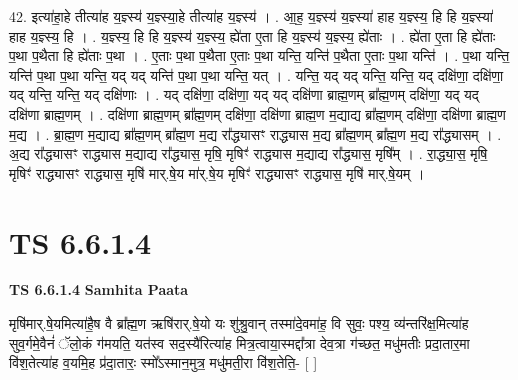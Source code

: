 \documentclass[17pt]{extarticle}
\begin{document}
42. इत्या॑हा॒हे तीत्या॑ह य॒ज्ञ्स्य॑ य॒ज्ञ्स्या॒हे तीत्या॑ह य॒ज्ञ्स्य॑ । . आ॒ह॒ य॒ज्ञ्स्य॑ य॒ज्ञ्स्या॑ हाह य॒ज्ञ्स्य॒ हि हि य॒ज्ञ्स्या॑ हाह य॒ज्ञ्स्य॒ हि । . य॒ज्ञ्स्य॒ हि हि य॒ज्ञ्स्य॑ य॒ज्ञ्स्य॒ ह्ये॑ता ए॒ता हि य॒ज्ञ्स्य॑ य॒ज्ञ्स्य॒ ह्ये॑ताः । . ह्ये॑ता ए॒ता हि ह्ये॑ताः प॒था प॒थैता हि ह्ये॑ताः प॒था । . ए॒ताः प॒था प॒थैता ए॒ताः प॒था यन्ति॒ यन्ति॑ प॒थैता ए॒ताः प॒था यन्ति॑ । . प॒था यन्ति॒ यन्ति॑ प॒था प॒था यन्ति॒ यद् यद् यन्ति॑ प॒था प॒था यन्ति॒ यत् । . यन्ति॒ यद् यद् यन्ति॒ यन्ति॒ यद् दक्षि॑णा॒ दक्षि॑णा॒ यद् यन्ति॒ यन्ति॒ यद् दक्षि॑णाः । . यद् दक्षि॑णा॒ दक्षि॑णा॒ यद् यद् दक्षि॑णा ब्राह्म॒णम् ब्रा᳚ह्म॒णम् दक्षि॑णा॒ यद् यद् दक्षि॑णा ब्राह्म॒णम् । . दक्षि॑णा ब्राह्म॒णम् ब्रा᳚ह्म॒णम् दक्षि॑णा॒ दक्षि॑णा ब्राह्म॒ण म॒द्याद्य ब्रा᳚ह्म॒णम् दक्षि॑णा॒ दक्षि॑णा ब्राह्म॒ण म॒द्य । . ब्रा॒ह्म॒ण म॒द्याद्य ब्रा᳚ह्म॒णम् ब्रा᳚ह्म॒ण म॒द्य रा᳚द्ध्यासꣳ राद्ध्यास म॒द्य ब्रा᳚ह्म॒णम् ब्रा᳚ह्म॒ण म॒द्य रा᳚द्ध्यासम् । . अ॒द्य रा᳚द्ध्यासꣳ राद्ध्यास म॒द्याद्य रा᳚द्ध्यास॒ मृषि॒ मृषिꣳ॑ राद्ध्यास म॒द्याद्य रा᳚द्ध्यास॒ मृषि᳚म् । . रा॒द्ध्या॒स॒ मृषि॒ मृषिꣳ॑ राद्ध्यासꣳ राद्ध्यास॒ मृषि॑ मार्.षे॒य मा॑र्.षे॒य मृषिꣳ॑ राद्ध्यासꣳ राद्ध्यास॒ मृषि॑ मार्.षे॒यम् । \newline
\pagebreak
{}

\section{ TS 6.6.1.4 }

\textbf{TS 6.6.1.4 } \newline
\textbf{Samhita Paata} \newline

मृषि॑मार्.षे॒यमित्या॑है॒ष वै ब्रा᳚ह्म॒ण ऋषि॑रार्.षे॒यो यः शु॑श्रु॒वान् तस्मा॑दे॒वमा॑ह॒ वि सुवः॒ पश्य॒ व्य॑न्तरि॑क्ष॒मित्या॑ह सुव॒र्गमे॒वैनं॑ ॅलो॒कं ग॑मयति॒ यत॑स्व सद॒स्यै॑रित्या॑ह मित्र॒त्वाया॒स्मद्दा᳚त्रा देव॒त्रा ग॑च्छत॒ मधु॑मतीः प्रदा॒तार॒मा वि॑श॒तेत्या॑ह व॒यमि॒ह प्र॑दा॒तारः॒ स्मो᳚ऽस्मान॒मुत्र॒ मधु॑मती॒रा वि॑श॒तेति॒- [  ] \newline
\end{document}

